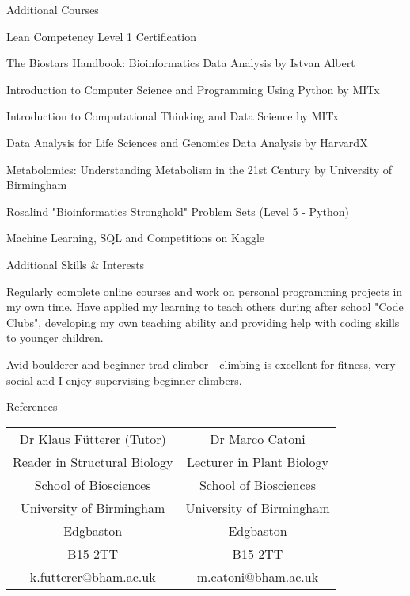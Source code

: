 \documentclass{resume}
\begin{document}
\begin{rSection}{Additional Courses} 
\item Lean Competency Level 1 Certification
\item The Biostars Handbook: Bioinformatics Data Analysis by Istvan Albert
\item Introduction to Computer Science and Programming Using Python by MITx
\item Introduction to Computational Thinking and Data Science by MITx
\item Data Analysis for Life Sciences and Genomics Data Analysis by HarvardX
\item Metabolomics: Understanding Metabolism in the 21st Century by University of Birmingham
\item Rosalind "Bioinformatics Stronghold" Problem Sets (Level 5 - Python)
\item Machine Learning, SQL and Competitions on Kaggle
\end{rSection}
\begin{rSection}{Additional Skills \& Interests} \itemsep -3pt
\item Regularly complete online courses and work on personal programming projects in my own time.  Have applied my learning to teach others during after school "Code Clubs", developing my own teaching ability and providing help with coding skills to younger children. 
\item Avid boulderer and beginner trad climber - climbing is excellent for fitness, very social and I enjoy supervising beginner climbers. 
\newpage
\end{rSection}
\begin{rSection}{References}

\begin{center}
\setlength{\tabcolsep}{35pt}
\begin{tabular}{cc} 
Dr Klaus F{\"u}tterer (Tutor) & Dr Marco Catoni  \\ 
Reader in Structural Biology & Lecturer in Plant Biology  \\ 
School of Biosciences & School of Biosciences  \\ 
University of Birmingham & University of Birmingham   \\
Edgbaston & Edgbaston  \\
B15 2TT & B15 2TT  \\
k.futterer@bham.ac.uk & m.catoni@bham.ac.uk \\
\end{tabular}
\end{center}
 
\end{rSection}
\end{document}
